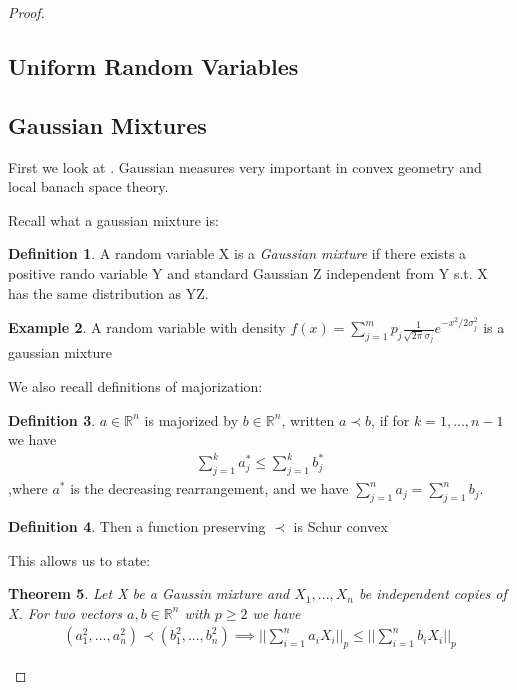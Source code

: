 \documentclass[10pt]{article}
\newcommand{\1}{\textbf{1}}
\newcommand{\R}{\mathbb{R}}
\newtheorem{theorem}{Theorem}
\theoremstyle{remark}
\theoremstyle{definition}
\newtheorem{defn}[theorem]{Definition}
\newtheorem{exmp}[theorem]{Example}
\begin{document}
\begin{proof}
\subsection{Uniform Random Variables}



\subsection{Gaussian Mixtures}

First we look at \cite{ENT}. Gaussian measures very important in convex geometry and local banach space theory. 

Recall what a gaussian mixture is:

\begin{defn}
	A random variable X is a \textit{Gaussian mixture} if there exists a positive rando variable Y and standard Gaussian Z independent from Y s.t. X has the same distribution as YZ.
\end{defn}

\begin{exmp}
	A random variable with density $f(x) = \sum_{j=1}^m p_j \frac{1}{\sqrt{2\pi}\sigma_j}e^{-x^2/2\sigma_j^2}$ is a gaussian mixture
\end{exmp}

We also recall definitions of majorization:

\begin{defn}
	$a \in \R^n$ is majorized by $b \in \R^n$, written $a \prec b$, if for $k = 1,...,n-1$ we have 
	\begin{align*}
		\sum_{j=1}^k a_j^* \leq \sum_{j=1}^k b_j^*
	\end{align*}
	,where $a^*$ is the decreasing rearrangement, and we have $\sum_{j=1}^n a_j = \sum_{j=1}^n b_j$. 
\end{defn}

\begin{defn}
	Then a function preserving $\prec$ is Schur convex
\end{defn}

This allows us to state:

\begin{theorem}
	Let X be a Gaussin mixture and $X_1,...,X_n$ be independent copies of X. For two vectors $a,b \in \R^n$ with $p \geq 2$ we have
	\begin{align*}
		(a_1^2,...,a_n^2) \prec (b_1^2,...,b_n^2) \implies ||\sum_{i=1}^n a_iX_i||_p \leq ||\sum_{i=1}^n b_iX_i||_p
	\end{align*}
\end{theorem}


\end{proof}
\end{document}
